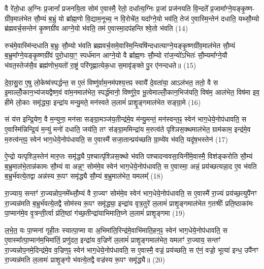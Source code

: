 वै रे॑तो॒धा अ॒ग्निः प्र॒जानां᳚ प्रजनयि॒ता सोम॑ ए॒वास्मै॒ रेतो॒ दधा᳚त्य॒ग्निः प्र॒जां प्रज॑नयति वि॒न्दते᳚ प्र॒जामा᳚ग्ने॒यङ्कृ॒ष्ण- ग्री॑व॒माल॑भेत सौ॒म्यं ब॒भ्रुं यो ब्रा᳚ह्म॒णो वि॒द्याम॒नूच्य॒ न वि॒रोचे॑त॒ यदा᳚ग्ने॒यो भव॑ति॒ तेज॑ ए॒वास्मि॒न्तेन॑ दधाति॒ यथ्सौ॒म्यो ब्र॑ह्मवर्च॒सन्तेन॑ कृ॒ष्णग्री॑व आग्ने॒यो भ॑वति॒ तम॑ ए॒वास्मा॒दप॑हन्ति श्वे॒तो भ॑वति (14)

रुच॑मे॒वास्मि॑न्दधाति ब॒भ्रुः सौ॒म्यो भ॑वति ब्रह्मवर्च॒समे॒वास्मि॒न्त्विषि॑न्दधात्याग्ने॒यङ्कृ॒ष्णग्री॑व॒माल॑भेत सौ॒म्यं ब॒भ्रुमा᳚ग्ने॒यङ्कृ॒ष्णग्री॑वं पुरो॒धाया॒ꣳ॒ स्पर्ध॑मान आग्ने॒यो वै ब्रा᳚ह्म॒णः सौ॒म्यो रा॑ज॒न्यो॑\-ऽभितः॑ सौ॒म्यमा᳚ग्ने॒यौ भ॑वत॒स्तेज॑सै॒व ब्रह्म॑णोभ॒यतो॑ रा॒ष्ट्रं परि॑गृह्णात्येक॒धा स॒मावृ॑ङ्क्ते पु॒र ए॑नन्दधते॥ (15)

{}

दे॒वा॒सु॒रा ए॒षु लो॒केष्व॑स्पर्द्धन्त॒ स ए॒तं विष्णु॑र्वाम॒नम॑पश्य॒त्तꣴ स्वायै॑ दे॒वता॑या॒ आ\-ऽल॑भत॒ ततो॒ वै स इ॒माल्लोँ॒कान॒भ्य॑जयद्वैष्ण॒वं वा॑म॒नमाल॑भेत॒ स्पर्द्ध॑मानो॒ विष्णु॑रे॒व भू॒त्वेमाल्लोँ॒कान॒भिज॑यति॒ विष॑म॒ आल॑भेत॒ विष॑मा इव॒ हीमे लो॒काः समृ॑द्ध्या॒ इन्द्रा॑य मन्यु॒मते॒ मन॑स्वते ल॒लामं॑ प्राशॄ॒ङ्गमाल॑भेत सङ्ग्रा॒मे (16)

सं य॑त्त इन्द्रि॒येण॒ वै म॒न्युना॒ मन॑सा सङ्ग्रा॒मञ्ज॑य॒तीन्द्र॑मे॒व म॑न्यु॒मन्तं॒ मन॑स्वन्त॒ꣴ॒ स्वेन॑ भाग॒धेये॒नोप॑धावति॒ स ए॒वास्मि॑न्निन्द्रि॒यं म॒न्युं मनो॑ दधाति॒ जय॑ति॒ तꣳ स॑ङ्ग्रा॒ममिन्द्रा॑य म॒रुत्व॑ते पृश्ञिस॒क्थमाल॑भेत॒ ग्राम॑काम॒ इन्द्र॑मे॒व म॒रुत्व॑न्त॒ꣴ॒ स्वेन॑ भाग॒धेये॒नोप॑धावति॒ स ए॒वास्मै॑ सजा॒तान्प्रय॑च्छति ग्रा॒म्ये॑व भ॑वति॒ यदृ॑ष॒भस्तेन॑ (17)

ऐ॒न्द्रो यत्पृश्ञि॒स्तेन॑ मारु॒तः समृ॑द्ध्यै प॒श्चात्पृ॑श्ञिस॒क्थो भ॑वति पश्चादन्ववसा॒यिनी॑मे॒वास्मै॒ विश॑ङ्करोति सौ॒म्यं ब॒भ्रुमाल॑भे॒तान्न॑कामः सौ॒म्यं वा अन्न॒ꣳ॒ सोम॑मे॒व स्वेन॑ भाग॒धेये॒नोप॑धावति॒ स ए॒वास्मा॒ अन्नं॒ प्रय॑च्छत्यन्ना॒द ए॒व भ॑वति ब॒भ्रुर्भ॑वत्ये॒तद्वा अन्न॑स्य रू॒पꣳ समृ॑द्ध्यै सौ॒म्यं ब॒भ्रुमाल॑भेत॒ यमलम्᳚ (18)

रा॒ज्याय॒ सन्तꣳ॑ रा॒ज्यन्नोप॒नमे᳚थ्सौ॒म्यं वै रा॒ज्यꣳ सोम॑मे॒व स्वेन॑ भाग॒धेये॒नोप॑धावति॒ स ए॒वास्मै॑ रा॒ज्यं प्रय॑च्छ॒त्युपै॑नꣳ रा॒ज्यन्न॑मति ब॒भ्रुर्भ॑वत्ये॒तद्वै सोम॑स्य रू॒पꣳ समृ॑द्ध्या॒ इन्द्रा॑य वृत्र॒तुरे॑ ल॒लामं॑ प्राशृ॒ङ्गमाल॑भेत ग॒तश्रीः᳚ प्रति॒ष्ठाका॑मः पा॒प्मान॑मे॒व वृ॒त्रन्ती॒र्त्वा प्र॑ति॒ष्ठां ग॑च्छ॒तीन्द्रा॑याभिमाति॒घ्ने ल॒लामं॑ प्राशृ॒ङ्गमा (19)

ल॒भे॒त॒ यः पा॒प्मना॑ गृही॒तः स्यात्पा॒प्मा वा अ॒भिमा॑ति॒रिन्द्र॑मे॒वाभि॑माति॒हन॒ꣴ॒ स्वेन॑ भाग॒धेये॒नोप॑धावति॒ स ए॒वास्मा᳚त्पा॒प्मान॑म॒भिमा॑तिं॒ प्रणु॑दत॒ इन्द्रा॑य व॒ज्रिणे॑ ल॒लामं॑ प्राशृ॒ङ्गमाल॑भेत॒ यमलꣳ॑ रा॒ज्याय॒ सन्तꣳ॑ रा॒ज्यन्नोप॒नमे॒दिन्द्र॑मे॒व व॒ज्रिण॒ꣴ॒ स्वेन॑ भाग॒धेये॒नोप॑धावति॒ स ए॒वास्मै॒ वज्रं॒ प्रय॑च्छति॒ स ए॑नं॒ वज्रो॒ भूत्या॑ इन्ध॒ उपै॑नꣳ रा॒ज्यन्न॑मति ल॒लामः॑ प्राशृ॒ङ्गो भ॑वत्ये॒तद्वै वज्र॑स्य रू॒पꣳ समृ॑द्ध्यै॥ (20)

